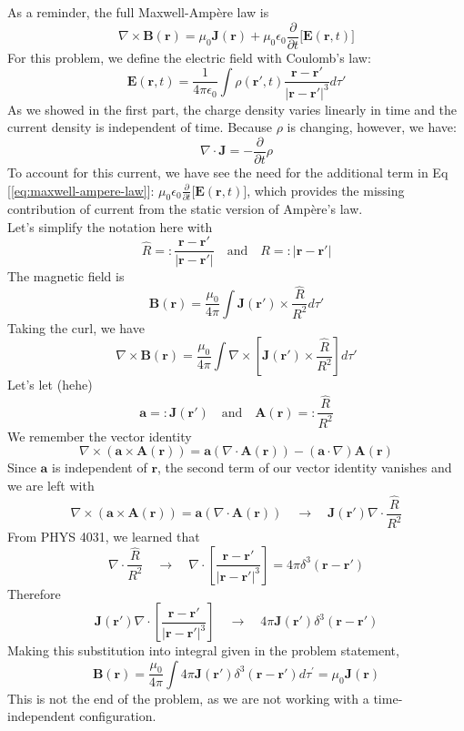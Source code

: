 \documentclass[a4paper,12pt]{article} %
\begin{document}
As a reminder, the full Maxwell-Ampère law is
\begin{equation}
\nabla \times \mathbf{B}(\mathbf{r}) = \mu_0\mathbf{J}(\mathbf{r}) + \mu_0\epsilon_0 \frac{\partial}{\partial t} \Big[\mathbf{E}(\mathbf{r}, t)\Big]
	\label{eq:maxwell-ampere-law}
\end{equation}
For this problem, we define the electric field with Coulomb's law:
\begin{equation}
\mathbf{E}(\mathbf{r}, t) = \frac{1}{4\pi\epsilon_0} \int \rho(\mathbf{r}', t)\frac{\mathbf{r} - \mathbf{r}'}{|\mathbf{r} - \mathbf{r}'|^3}d\tau'
	\label{eq:coulomb-law}
\end{equation}
As we showed in the first part, the charge density varies linearly in time and the current density is independent of time. Because $\rho$ is changing, however, we have:
$$ \nabla \cdot \mathbf{J} = -\frac{\partial}{\partial t} \rho $$
To account for this current, we have see the need for the additional term in Eq [\ref{eq:maxwell-ampere-law}]: $\mu_0\epsilon_0\frac{\partial}{\partial t} \Big[\mathbf{E}(\mathbf{r}, t)\Big]$, which provides the missing contribution of current from the static version of Ampère's law.\\

Let's simplify the notation here with
$$ \hat{R} =: \frac{\mathbf{r} - \mathbf{r}'}{|\mathbf{r} - \mathbf{r}'|} \quad \text{and} \quad R =: |\mathbf{r} - \mathbf{r}'| $$
The magnetic field is
$$ \mathbf{B}(\mathbf{r}) = \frac{\mu_0}{4\pi} \int \mathbf{J}(\mathbf{r}')\times \frac{\hat{R}}{R^2} d\tau' $$
Taking the curl, we have
$$ \nabla \times \mathbf{B}(\mathbf{r}) = \frac{\mu_0}{4\pi} \int \nabla \times \left[ \mathbf{J}(\mathbf{r}')\times \frac{\hat{R}}{R^2} \right] d\tau'$$
Let's let (hehe)
$$ \mathbf{a} =: \mathbf{J}(\mathbf{r}') \quad\text{and}\quad \mathbf{A}(\mathbf{r}) =: \frac{\hat{R}}{R^2} $$
We remember the vector identity
$$ \nabla\times\left(\mathbf{a} \times \mathbf{A}(\mathbf{r})\right) = \mathbf{a}\left(\nabla\cdot\mathbf{A}(\mathbf{r})\right) - \left(\mathbf{a}\cdot\nabla\right)\mathbf{A}(\mathbf{r}) $$
Since $\mathbf{a}$ is independent of $\mathbf{r}$, the second term of our vector identity vanishes and we are left with
$$ \nabla\times\left(\mathbf{a} \times \mathbf{A}(\mathbf{r})\right) = \mathbf{a}\left(\nabla\cdot\mathbf{A}(\mathbf{r})\right) \quad\rightarrow\quad \mathbf{J}(\mathbf{r}')\nabla \cdot \frac{\hat{R}}{R^2} $$
From PHYS 4031, we learned that
$$ \nabla \cdot \frac{\hat{R}}{R^2} \quad\rightarrow\quad \nabla \cdot \left[\frac{\mathbf{r} - \mathbf{r}'}{|\mathbf{r} - \mathbf{r}'|^3}\right] = 4\pi\delta^3(\mathbf{r} - \mathbf{r}') $$
Therefore
$$ \mathbf{J}(\mathbf{r}')\nabla \cdot \left[\frac{\mathbf{r} - \mathbf{r}'}{|\mathbf{r} - \mathbf{r}'|^3}\right] \quad\rightarrow\quad 4\pi\mathbf{J}(\mathbf{r}')\delta^3(\mathbf{r} - \mathbf{r}') $$
Making this substitution into integral given in the problem statement,
$$ \boxed{\mathbf{B}(\mathbf{r})=\frac{\mu_0}{4 \pi} \int 4\pi\mathbf{J}(\mathbf{r}')\delta^3(\mathbf{r} - \mathbf{r}') d \tau^{\prime} = \mu_0\mathbf{J}(\mathbf{r})} $$
This is not the end of the problem, as we are not working with a time-independent configuration.\\
\end{document}
